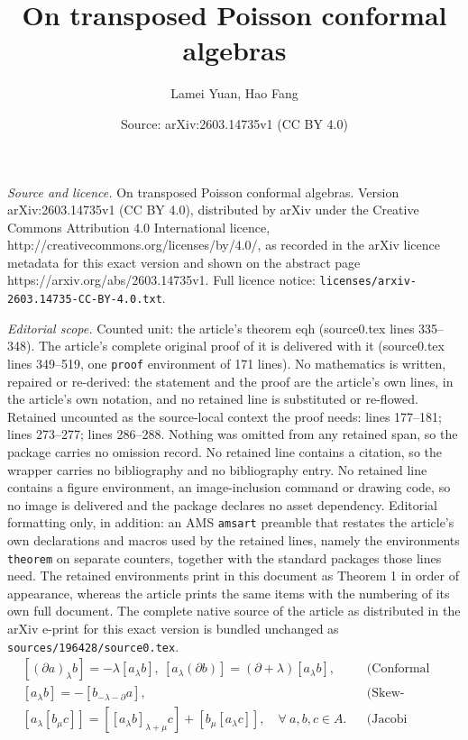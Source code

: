 \documentclass[10pt,a4paper]{amsart}
\title{On transposed Poisson conformal algebras}
\author{Lamei Yuan, Hao Fang}
\date{Source: arXiv:2603.14735v1 (CC BY 4.0)}
\begin{document}
\maketitle

\noindent\emph{Source and licence.} On transposed Poisson conformal algebras. Version arXiv:2603.14735v1 (CC BY 4.0), distributed by arXiv under the Creative Commons Attribution 4.0 International licence, http://creativecommons.org/licenses/by/4.0/, as recorded in the arXiv licence metadata for this exact version and shown on the abstract page https://arxiv.org/abs/2603.14735v1. Full licence notice: \texttt{licenses/arxiv-2603.14735-CC-BY-4.0.txt}.\par\smallskip

\noindent\textit{Editorial scope.} Counted unit: the article's theorem eqh (source0.tex lines 335--348). The article's complete original proof of it is delivered with it (source0.tex lines 349--519, one \texttt{proof} environment of 171 lines). No mathematics is written, repaired or re-derived: the statement and the proof are the article's own lines, in the article's own notation, and no retained line is substituted or re-flowed.  Retained uncounted as the source-local context the proof needs: lines 177--181; lines 273--277; lines 286--288.  Nothing was omitted from any retained span, so the package carries no omission record.  No retained line contains a citation, so the wrapper carries no bibliography and no bibliography entry.  No retained line contains a figure environment, an image-inclusion command or drawing code, so no image is delivered and the package declares no asset dependency.  Editorial formatting only, in addition: an AMS \texttt{amsart} preamble that restates the article's own declarations and macros used by the retained lines, namely the environments \texttt{theorem} on separate counters, together with the standard packages those lines need.  The retained environments print in this document as Theorem 1 in order of appearance, whereas the article prints the same items with the numbering of its own full document.  The complete native source of the article as distributed in the arXiv e-print for this exact version is bundled unchanged as \texttt{sources/196428/source0.tex}.
   \begin{align}
        &[(\partial a)_{\lambda}b]=-\lambda[a_{\lambda}b],~[a_{\lambda}(\partial b)]=(\partial+\lambda)[a_{\lambda}b], &&\text{(Conformal sesquilinearity)}\\
        &[a_{\lambda}b]=-[b_{-\lambda-\partial}a], &&\text{(Skew-symmetry)}\\
        &[a_{\lambda}[b_{\mu}c]]=[[a_{\lambda}b]_{\lambda+\mu}c]+[b_{\mu}[a_{\lambda}c]], \quad \forall ~a,b,c\in {A}.&&\text{(Jacobi identity)} \label{Jacobi}
   \end{align}
\end{document}
